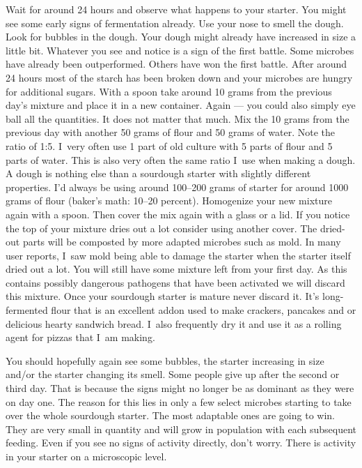 Wait for around 24 hours and observe what happens to your starter.
You might see some early signs of fermentation already. Use your nose
to smell the dough. Look for bubbles in the dough. Your dough
might already have increased in size a little bit. Whatever
you see and notice is a sign of the first battle. Some microbes
have already been outperformed. Others have won the first battle.
After around 24 hours most of the starch has been broken down
and your microbes are hungry for additional sugars. With a spoon
take around 10 grams from the previous day's mixture and place
it in a new container. Again --- you could also simply eye ball
all the quantities. It does not matter that much. Mix the 10
grams from the previous day with another 50 grams of flour
and 50 grams of water. Note the ratio of 1:5. I~very often use
1 part of old culture with 5 parts of flour and 5 parts of water.
This is also very often the same ratio I~use when making a dough.
A dough is nothing else than a sourdough starter with slightly different
properties. I'd always be using around 100--200 grams of starter
for around 1000 grams of flour (baker's math: 10--20 percent).
Homogenize your new mixture again with a spoon. Then cover
the mix again with a glass or a lid. If you notice the top of
your mixture dries out a lot consider using another cover. The
dried-out parts will be composted by more adapted microbes such as
mold. In many user reports, I~saw mold being able to damage
the starter when the starter itself dried out a lot. You will
still have some mixture left from your first day. As this contains
possibly dangerous pathogens that have been activated we will discard
this mixture. Once your sourdough starter is mature never
discard it. It's long-fermented flour that is an excellent addon
used to make crackers, pancakes and or delicious hearty sandwich
bread. I~also frequently dry it and use it as a rolling agent
for pizzas that I~am making.

You should hopefully again see some bubbles, the starter increasing
in size and/or the starter changing its smell. Some people give
up after the second or third day. That is because the signs might no longer
be as dominant as they were on day one. The reason for this lies in only a few
select microbes starting to take over the whole sourdough starter. The most
adaptable ones are going to win. They are very small in quantity and will
grow in population with each subsequent feeding. Even if you see no signs
of activity directly, don't worry. There is activity in
your starter on a microscopic level.

